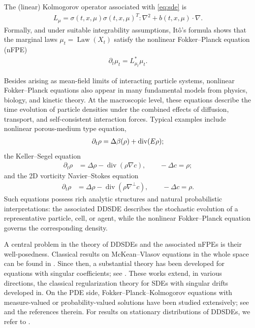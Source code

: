 \documentclass[UTF-8,reqno]{amsart}
\numberwithin{equation}{section}
\theoremstyle{definition}
\def\div{\mathord{{\rm div}}}
\def\div{\mathord{{\rm div}}}
\begin{document}
The (linear) Kolmogorov operator associated with \eqref{eq:sde} is
\begin{align*}
L_\mu 
=
\sigma(t,x,\mu)\sigma(t,x,\mu)^T:\nabla^2
+
b(t,x,\mu)\cdot\nabla.
\end{align*}
Formally, and  under suitable integrability assumptions,
It\^o's formula shows that the marginal laws
$\mu_t=\operatorname{Law}(X_t)$ satisfy the nonlinear Fokker--Planck equation (nFPE)
\begin{align*}
\partial_t\mu_t
=
L_{\mu_t}^*\mu_t.
\end{align*} 
 

Besides arising as mean-field limits of interacting particle systems,
nonlinear Fokker--Planck equations also appear in many fundamental models from
physics, biology, and kinetic theory. At the macroscopic level, these equations
describe the time evolution of  particle densities
under the combined effects of diffusion, transport, and self-consistent
interaction forces.  
Typical examples include  nonlinear   porous-medium type equation,
\begin{align*}
\partial_t\rho
=
\Delta\beta(\rho)+\div(E\rho);
\end{align*} 
the Keller--Segel equation
\begin{align*}
\partial_t\rho
&=
\Delta\rho
-
\operatorname{div}(\rho\nabla c),
\qquad
-\Delta c= \rho;
\end{align*}
and the 2D vorticity Navier--Stokes equation
\begin{align*}
\partial_t\rho
&=
\Delta\rho
-
\operatorname{div}(\rho\nabla^\perp c),
\qquad
-\Delta c= \rho.
\end{align*}
Such equations possess rich analytic structures and natural probabilistic
interpretations: the associated DDSDE describes the stochastic evolution of a
representative particle, cell, or agent, while the nonlinear Fokker--Planck
equation governs the corresponding   density.
 

A central problem in the theory of DDSDEs and the associated nFPEs is their well-posedness. Classical results on
McKean--Vlasov equations in the whole space can be found in
\cite{Fun84,Szn84,Sch87,Chi94}. Since then, a substantial theory has been
developed for equations with singular coefficients; see
\cite{RZ21,CRF22,HW23,Wan23,Zha25}. These works extend, in various directions, the classical regularization theory for SDEs with singular drifts developed in\cite{KR05}. 
On the PDE side, Fokker--Planck--Kolmogorov equations with
measure-valued or probability-valued solutions have been studied extensively;
see   \cite{ BR21,BR22,BR23,BSS23} and the references therein. For results on
stationary distributions of DDSDEs, we refer to
\cite{Wan18,LM22,HWY24}. 
 
\end{document}
